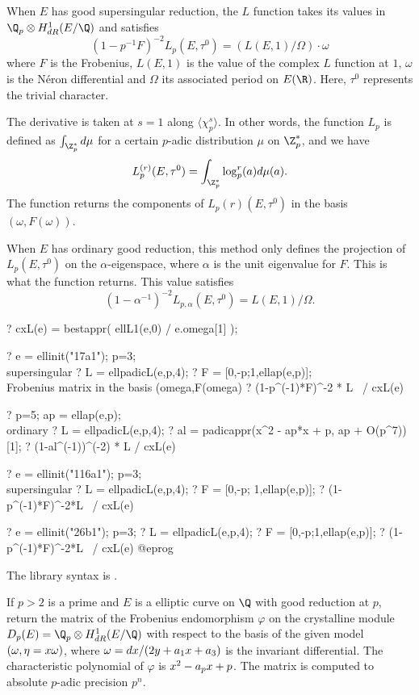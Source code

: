  When $E$ has good supersingular reduction, the $L$ function takes its
 values in $\Q_p \otimes H^1_{dR}(E/\Q)$ and satisfies
 $$(1-p^{-1} F)^{-2} L_p(E, \tau^0)= (L(E,1) / \Omega) \cdot \omega$$
 where $F$ is the Frobenius, $L(E,1)$ is the value of the complex $L$
 function at $1$, $\omega$ is the N\'eron differential
 and $\Omega$ its associated period on $E(\R)$. Here, $\tau^0$ represents
 the trivial character.

 The derivative is taken at $s=1$ along $\langle\chi_p^s\rangle$.
 In other words, the function $L_p$ is defined as
 $\int_{\Z_p^*} d \mu$ for a certain $p$-adic distribution $\mu$ on
 $\Z_p^*$, and we have
  $$L_p^{(r)}(E, \tau^0) = \int_{\Z_p^*} \log_p^r(a) d\mu(a).$$
 The function returns the components of $L_p{(r)}(E,\tau^0)$ in
 the basis $(\omega, F(\omega))$.
 \smallskip

 When $E$ has ordinary good reduction, this method only defines
 the projection of $L_p(E,\tau^0)$ on the $\alpha$-eigenspace,
 where $\alpha$ is the unit eigenvalue for $F$. This is what the function
 returns. This value satisfies
 $$(1- \alpha^{-1})^{-2} L_{p,\alpha}(E,\tau^0)= L(E,1) / \Omega.$$

 \bprog
 ? cxL(e) = bestappr( ellL1(e,0) / e.omega[1] );

 ? e = ellinit("17a1"); p=3; \\ supersingular
 ? L = ellpadicL(e,p,4);
 ? F = [0,-p;1,ellap(e,p)]; \\ Frobenius matrix in the basis (omega,F(omega)
 ? (1-p^(-1)*F)^-2 * L~ / cxL(e)

 ? p=5; ap = ellap(e,p); \\ ordinary
 ? L = ellpadicL(e,p,4);
 ? al = padicappr(x^2 - ap*x + p, ap + O(p^7))[1];
 ? (1-al^(-1))^(-2) * L / cxL(e)

 ? e = ellinit("116a1"); p=3; \\ supersingular
 ? L = ellpadicL(e,p,4);
 ? F = [0,-p; 1,ellap(e,p)];
 ? (1-p^(-1)*F)^-2*L~ / cxL(e)

 ? e = ellinit("26b1"); p=3;
 ? L = ellpadicL(e,p,4);
 ? F = [0,-p;1,ellap(e,p)];
 ? (1-p^(-1)*F)^-2*L~ / cxL(e)
 @eprog

The library syntax is .

\label{se:ellpadicfrobenius}
If $p>2$ is a prime and $E$ is a elliptic curve on $\Q$ with good
reduction at $p$, return the matrix of the Frobenius endomorphism $\varphi$ on
the crystalline module $D_p(E)= \Q_p \otimes H^1_{dR}(E/\Q)$ with respect to
the basis of the given model $(\omega, \eta=x\*\omega)$, where
$\omega = dx/(2\*y+a_1\*x+a_3)$ is the invariant differential.
The characteristic polynomial of $\varphi$ is $x^2 - a_p\*x + p$.
The matrix is computed to absolute $p$-adic precision $p^n$.

